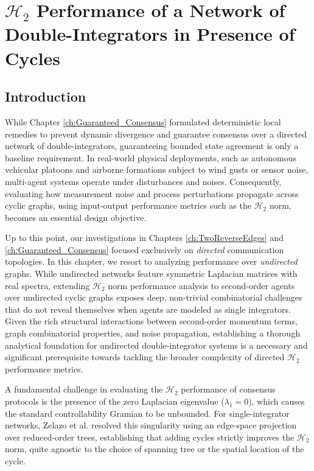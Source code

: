 \chapter[$\mathcal{H}_2$ Performance of Cyclic Networks]{$\mathcal{H}_2$ Performance of a Network of Double-Integrators in Presence of Cycles}\label{ch:Robustness_Analysis}
\section{Introduction}\label{sec:ch_RA_intro}
While Chapter \ref{ch:Guaranteed_Consensus} formulated deterministic local remedies to prevent dynamic divergence and guarantee consensus over a directed network of double-integrators, guaranteeing bounded state agreement is only a baseline requirement. In real-world physical deployments, such as autonomous vehicular platoons and airborne formations subject to wind gusts or sensor noise, multi-agent systems operate under disturbances and noises. Consequently, evaluating how measurement noise and process perturbations propagate across cyclic graphs, using input-output performance metrics such as the $\mathcal{H}_2$ norm, becomes an essential design objective.

Up to this point, our investigations in Chapters \ref{ch:TwoReverseEdges} and \ref{ch:Guaranteed_Consensus} focused exclusively on \emph{directed} communication topologies. In this chapter, we resort to analyzing performance over \emph{undirected} graphs. While undirected networks feature symmetric Laplacian matrices with real spectra, extending $\mathcal{H}_2$ norm performance analysis to second-order agents over undirected cyclic graphs exposes deep, non-trivial combinatorial challenges that do not reveal themselves when agents are modeled as single integrators. Given the rich structural interactions between second-order momentum terms, graph combinatorial properties, and noise propagation, establishing a thorough analytical foundation for undirected double-integrator systems is a necessary and significant prerequisite towards tackling the broader complexity of directed $\mathcal{H}_2$ performance metrics.

A fundamental challenge in evaluating the $\mathcal{H}_2$ performance of consensus protocols is the presence of the zero Laplacian eigenvalue ($\lambda_1 = 0$), which causes the standard controllability Gramian to be unbounded. For single-integrator networks, Zelazo et al. \cite{zelazo2010edge, zelazo2013performance} resolved this singularity using an edge-space projection over reduced-order trees, establishing that adding cycles strictly improves the $\mathcal{H}_2$ norm, quite agnostic to the choice of spanning tree or the spatial location of the cycle. 

